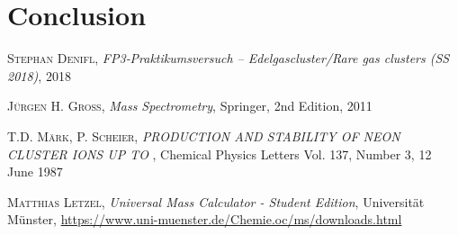 \documentclass[a4paper,10pt]{article}
\begin{document}
\section{Conclusion}

\begin{thebibliography}{99}

\textsc{Stephan Denifl}, \textit{FP3‐Praktikumsversuch – Edelgascluster/Rare gas clusters (SS 2018)}, 2018

\textsc{Jürgen H. Gross}, \textit{Mass Spectrometry}, Springer, 2nd Edition, 2011

\textsc{T.D. Märk, P. Scheier}, \textit{PRODUCTION AND STABILITY OF NEON CLUSTER IONS UP TO } , Chemical Physics Letters Vol. 137, Number 3, 12 June 1987

\textsc{Matthias Letzel}, \textit{Universal Mass Calculator - Student Edition}, Universität Münster, \url{https://www.uni-muenster.de/Chemie.oc/ms/downloads.html}
\end{thebibliography}
\end{document}
